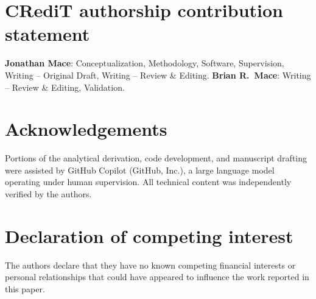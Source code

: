 \documentclass[review]{elsarticle}
\begin{document}
\section*{CRediT authorship contribution statement}
\textbf{Jonathan Mace}: Conceptualization, Methodology, Software, Supervision,
Writing -- Original Draft, Writing -- Review \& Editing.
\textbf{Brian R.\ Mace}: Writing -- Review \& Editing, Validation.

\section*{Acknowledgements}
Portions of the analytical derivation, code development, and manuscript
drafting were assisted by GitHub Copilot (GitHub, Inc.), a large language
model operating under human supervision.  All technical content was
independently verified by the authors.

\section*{Declaration of competing interest}
The authors declare that they have no known competing financial interests
or personal relationships that could have appeared to influence the work
reported in this paper.
\end{document}
